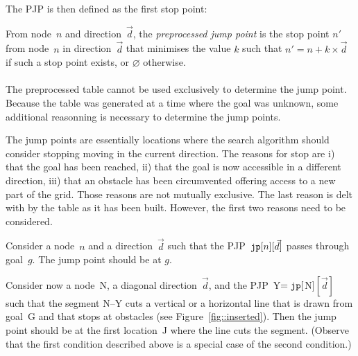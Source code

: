 The PJP is then defined as the first stop point: 
\begin{definition}
  From node~$n$ and direction~$\vec{d}$, 
  the \emph{preprocessed jump point} is the stop point $n'$ 
  from node~$n$ in direction~$\vec{d}$ 
  that minimises the value $k$ such that $n' = n + k \times \vec{d}$ 
  if such a stop point exists, or $\varnothing$ otherwise.  
\end{definition}

\paragraph*{}

The preprocessed table cannot be used exclusively 
to determine the jump point.  
Because the table was generated 
at a time where the goal was unknown, 
some additional reasonning is necessary to determine the jump points.  

The jump points are essentially locations 
where the search algorithm should consider 
stopping moving in the current direction.  
The reasons for stop are 
i) that the goal has been reached, 
ii) that the goal is now accessible in a different direction, 
iii) that an obstacle has been circumvented 
offering access to a new part of the grid.  
Those reasons are not mutually exclusive.  
The last reason is delt with 
by the table as it has been built.  
However, the first two reasons need to be considered.  

Consider a node~$n$ and a direction~$\vec{d}$ 
such that the PJP~$\texttt{jp}[n][\vec{d}]$ passes through goal~$g$.  
The jump point should be at $g$.  

Consider now a node~N, a diagonal direction~$\vec{d}$, 
and the PJP~Y$ = \texttt{jp}[$N$][\vec{d}]$ 
such that the segment N--Y cuts a vertical or a horizontal line 
that is drawn from goal~G and that stops at obstacles 
(see Figure~\ref{fig::inserted}).  
Then the jump point should be at the first location~J
where the line cuts the segment.  
(Observe that the first condition described above 
is a special case of the second condition.)

